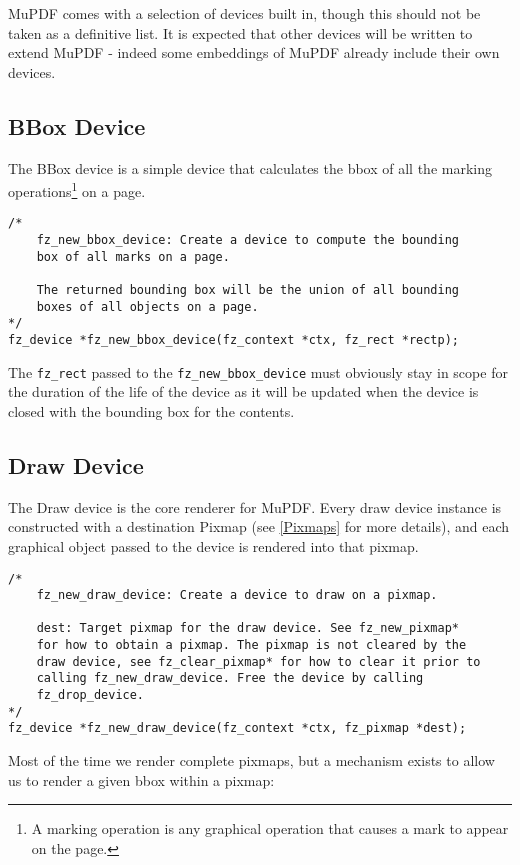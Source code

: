 \documentclass[oneside]{book}
\newcommand{\rjwref}[1] {\autoref{#1} \nameref{#1}}
\begin{document}
MuPDF comes with a selection of devices built in, though this should not be taken as a definitive list. It is expected that other devices will be written to extend MuPDF - indeed some embeddings of MuPDF already include their own devices.

\subsection{BBox Device}

The BBox device is a simple device that calculates the bbox of all the marking operations\footnote{A marking operation is any graphical operation that causes a mark to appear on the page.} on a page.

\begin{lstlisting}
/*
	fz_new_bbox_device: Create a device to compute the bounding
	box of all marks on a page.

	The returned bounding box will be the union of all bounding
	boxes of all objects on a page.
*/
fz_device *fz_new_bbox_device(fz_context *ctx, fz_rect *rectp);
\end{lstlisting}

The \texttt{fz\_rect} passed to the \texttt{fz\_new\_bbox\_device} must obviously stay in scope for the duration of the life of the device as it will be updated when the device is closed with the bounding box for the contents.

\subsection{Draw Device}
\label{DrawDevice}

The Draw device is the core renderer for MuPDF. Every draw device instance is constructed with a destination Pixmap (see \rjwref{Pixmaps} for more details), and each graphical object passed to the device is rendered into that pixmap.

\begin{lstlisting}
/*
	fz_new_draw_device: Create a device to draw on a pixmap.

	dest: Target pixmap for the draw device. See fz_new_pixmap*
	for how to obtain a pixmap. The pixmap is not cleared by the
	draw device, see fz_clear_pixmap* for how to clear it prior to
	calling fz_new_draw_device. Free the device by calling
	fz_drop_device.
*/
fz_device *fz_new_draw_device(fz_context *ctx, fz_pixmap *dest);
\end{lstlisting}

Most of the time we render complete pixmaps, but a mechanism exists to allow us to render a given bbox within a pixmap:
\end{document}
